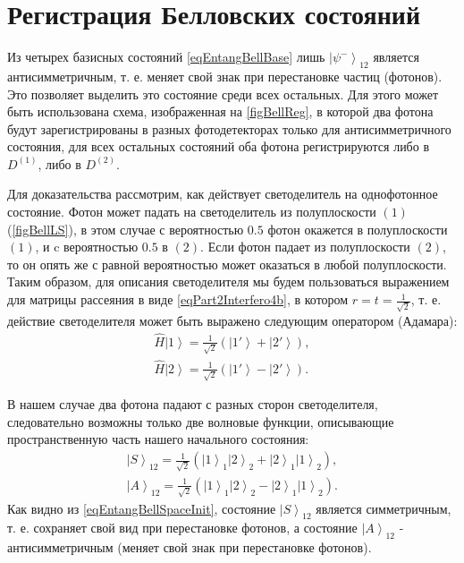 \section{Регистрация Белловских состояний}
\label{pPart3EntangleBellReg}
Из четырех базисных состояний \eqref{eqEntangBellBase} лишь 
$\left|\psi^{-}\right>_{12}$ является антисимметричным, т. е. меняет
свой знак при перестановке частиц (фотонов). Это позволяет выделить
это состояние среди всех остальных. Для этого может быть использована
схема, изображенная на \autoref{figBellReg}, в которой два фотона
будут зарегистрированы в разных фотодетекторах только для
антисимметричного состояния, для всех остальных состояний оба фотона
регистрируются либо в $D^{(1)}$, либо в $D^{(2)}$.


 
Для доказательства рассмотрим, как действует светоделитель на однофотонное
состояние. Фотон может падать на светоделитель из полуплоскости
$\left(1\right)$ (\autoref{figBellLS}), в этом случае с вероятностью
$0.5$ фотон окажется в полуплоскости $\left(1\right)$, и c вероятностью
$0.5$ в $\left(2\right)$. Если фотон падает из полуплоскости
$\left(2\right)$, то он опять же с равной вероятностью может оказаться
в любой полуплоскости. 
Таким образом, для описания светоделителя мы будем пользоваться выражением
для матрицы рассеяния в виде \eqref{eqPart2Interfero4b}, в котором
$r=t=\frac{1}{\sqrt{2}}$, т. е. действие светоделителя может быть
выражено следующим оператором (Адамара\cite{bPhisQuantInfo}):
\begin{eqnarray}
\hat{H} \left|1\right> = \frac{1}{\sqrt{2}}
\left(\left|1'\right> +
\left|2'\right>\right),
\nonumber \\
\hat{H} \left|2\right> = \frac{1}{\sqrt{2}}\left(\left|1'\right> -
\left|2'\right>\right).
\label{eqEntangBellHadamar}
\end{eqnarray}

В нашем случае два фотона падают с разных сторон светоделителя,
следовательно возможны только две волновые функции, описывающие
пространственную часть нашего начального состояния:
\begin{eqnarray}
\left|S\right>_{12} = \frac{1}{\sqrt{2}}\left(
\left|1\right>_1\left|2\right>_2 +
\left|2\right>_1\left|1\right>_2\right),
\nonumber \\
\left|A\right>_{12} = \frac{1}{\sqrt{2}}\left(
\left|1\right>_1\left|2\right>_2 -
\left|2\right>_1\left|1\right>_2\right).
\label{eqEntangBellSpaceInit}
\end{eqnarray}
Как видно из \eqref{eqEntangBellSpaceInit}, состояние $\left|S\right>_{12}$
является симметричным, т. е. сохраняет свой вид при перестановке
фотонов, а состояние $\left|A\right>_{12}$ - антисимметричным (меняет свой
знак при перестановке фотонов).

